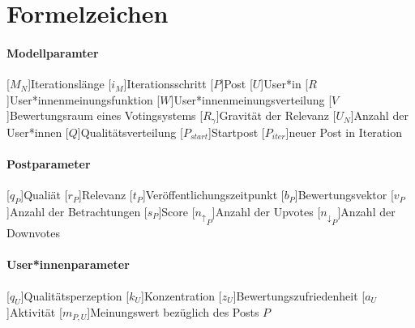 \cleardoublepage
{}

\chapter*{Formelzeichen}

\subsubsection*{Modellparamter}
\begin{acronym}[LONGEST]
[\ensuremath{M_N}]{Iterationslänge}
[\ensuremath{i_M}]{Iterationsschritt}
[\ensuremath{P}]{Post}
[\ensuremath{U}]{User*in}
[\ensuremath{R}]{User*innenmeinungsfunktion}
[\ensuremath{W}]{User*innenmeinungsverteilung}
[\ensuremath{V}]{Bewertungsraum eines Votingsystems}
[\ensuremath{R_\gamma}]{Gravität der Relevanz}
[\ensuremath{U_N}]{Anzahl der User*innen}
[\ensuremath{Q}]{Qualitätsverteilung}
[\ensuremath{{P_{start}}}]{Startpost}
[\ensuremath{{P_{iter}}}]{neuer Post in Iteration}
\end{acronym}

\subsubsection*{Postparameter}
\begin{acronym}[LONGEST]
[\ensuremath{q_P}]{Qualiät}
[\ensuremath{r_P}]{Relevanz}
[\ensuremath{t_P}]{Veröffentlichungszeitpunkt}
[\ensuremath{b_P}]{Bewertungsvektor}
[\ensuremath{v_P}]{Anzahl der Betrachtungen}
[\ensuremath{s_P}]{Score}
[\ensuremath{{n_\uparrow}_P}]{Anzahl der Upvotes}
[\ensuremath{{n_\downarrow}_P}]{Anzahl der Downvotes}
\end{acronym}

\subsubsection*{User*innenparameter}
\begin{acronym}[LONGEST]
	[\ensuremath{q_U}]{Qualitätsperzeption}
	[\ensuremath{k_U}]{Konzentration}
	[\ensuremath{z_U}]{Bewertungszufriedenheit}
	[\ensuremath{a_U}]{Aktivität}
	[\ensuremath{m_{P,U}}]{Meinungswert bezüglich des Posts $P$}
\end{acronym}


